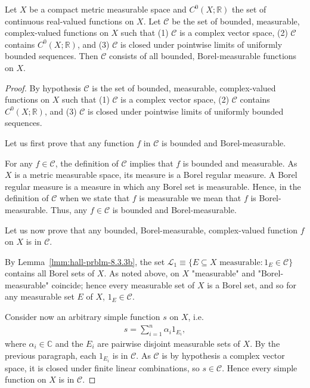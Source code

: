 \begin{lemma}
    \label{lmm:hall-prblm-8.3.3c}
    \leanok
    Let $X$ be a compact metric measurable space and $C^0(X; \mathbb{R})$ the set of continuous real-valued functions on $X$. Let $\mathcal{C}$ be the set of bounded, measurable, complex-valued functions on $X$ such that (1) $\mathcal{C}$ is a complex vector space, (2) $\mathcal{C}$ contains $C^0(X; \mathbb{R})$, and (3) $\mathcal{C}$ is closed under pointwise limits of uniformly bounded sequences. Then $\mathcal{C}$ consists of all bounded, Borel-measurable functions on $X$.
\end{lemma}
\begin{proof}
    \leanok
By hypothesis $\mathcal{C}$ is the set of bounded, measurable, complex-valued functions on $X$ such that (1) $\mathcal{C}$ is a complex vector space, (2) $\mathcal{C}$ contains $C^0(X; \mathbb{R})$, and (3) $\mathcal{C}$ is closed under pointwise limits of uniformly bounded sequences.

Let us first prove that any function $f$ in $\mathcal{C}$ is bounded and Borel-measurable.

For any $f \in \mathcal{C}$, the definition of $\mathcal{C}$ implies that $f$ is bounded and measurable. As $X$ is a metric measurable space, its measure is a Borel regular measure. A Borel regular measure is a measure in which any Borel set is measurable. Hence, in the definition of $\mathcal{C}$ when we state that $f$ is measurable we mean that $f$ is Borel-measurable. Thus, any $f \in \mathcal{C}$ is bounded and Borel-measurable.

Let us now prove that any bounded, Borel-measurable, complex-valued function $f$ on $X$ is in $\mathcal{C}$.

By Lemma~\ref{lmm:hall-prblm-8.3.3b}, the set $\mathcal{L}_1 \equiv \{ E \subseteq X \text{ measurable} : 1_E \in \mathcal{C} \}$ contains all Borel sets of $X$. As noted above, on $X$ "measurable" and "Borel-measurable" coincide; hence every measurable set of $X$ is a Borel set, and so for any measurable set $E$ of $X$, $1_E \in \mathcal{C}$.

Consider now an arbitrary simple function $s$ on $X$, i.e.
\begin{align}
    s = \sum_{i = 1}^n \alpha_i 1_{E_i},
\end{align}
where $\alpha_i \in \mathbb{C}$ and the $E_i$ are pairwise disjoint measurable sets of $X$. By the previous paragraph, each $1_{E_i}$ is in $\mathcal{C}$. As $\mathcal{C}$ is by hypothesis a complex vector space, it is closed under finite linear combinations, so $s \in \mathcal{C}$. Hence every simple function on $X$ is in $\mathcal{C}$.


\end{proof}
